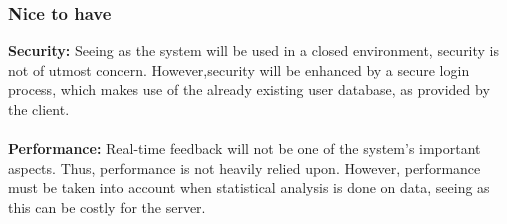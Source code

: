 \subsubsection{Nice to have}
	{\bfseries Security:}
	Seeing as the system will be used in a closed environment, security is not of utmost concern. However,security will be enhanced by a secure login process, which makes use of the already existing user database, as provided by the client.
	\\ \\
	{\bfseries Performance:}
	Real-time feedback will not be one of the system's important aspects. Thus, performance is not heavily relied upon. However, performance must be taken into account when statistical analysis is done on data, seeing as this can be costly for the server.

	

